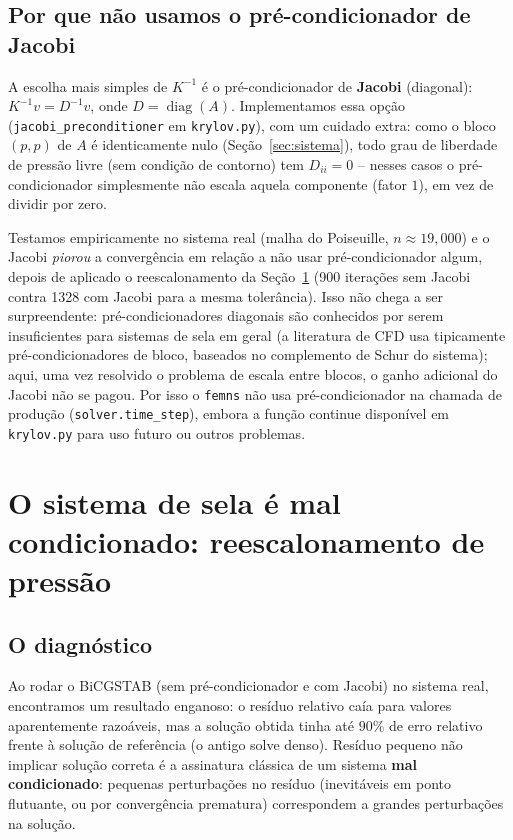 \documentclass[11pt,a4paper]{article}
\begin{document}
\subsection{Por que não usamos o pré-condicionador de Jacobi}

A escolha mais simples de $K^{-1}$ é o pré-condicionador de
\textbf{Jacobi} (diagonal): $K^{-1}v = D^{-1}v$, onde $D =
\operatorname{diag}(A)$. Implementamos essa opção
(\texttt{jacobi\_preconditioner} em \texttt{krylov.py}), com um cuidado
extra: como o bloco $(p,p)$ de $A$ é identicamente nulo
(Seção~\ref{sec:sistema}), todo grau de liberdade de pressão livre
(sem condição de contorno) tem $D_{ii}=0$ -- nesses casos o
pré-condicionador simplesmente não escala aquela componente (fator
$1$), em vez de dividir por zero.

Testamos empiricamente no sistema real (malha do Poiseuille,
$n\approx 19{,}000$) e o Jacobi \emph{piorou} a convergência em
relação a não usar pré-condicionador algum, depois de aplicado o
reescalonamento da Seção~\ref{sec:reescalonamento} (900 iterações sem
Jacobi contra 1328 com Jacobi para a mesma tolerância). Isso não chega
a ser surpreendente: pré-condicionadores diagonais são conhecidos por
serem insuficientes para sistemas de sela em geral (a literatura de
CFD usa tipicamente pré-condicionadores de bloco, baseados no
complemento de Schur do sistema); aqui, uma vez resolvido o problema
de escala entre blocos, o ganho adicional do Jacobi não se pagou.
Por isso o \texttt{femns} não usa pré-condicionador na chamada de
produção (\texttt{solver.time\_step}), embora a função continue
disponível em \texttt{krylov.py} para uso futuro ou outros problemas.

\section{O sistema de sela é mal condicionado: reescalonamento de pressão}
\label{sec:reescalonamento}

\subsection{O diagnóstico}

Ao rodar o BiCGSTAB (sem pré-condicionador e com Jacobi) no sistema
real, encontramos um resultado enganoso: o resíduo relativo caía para
valores aparentemente razoáveis, mas a solução obtida tinha até
$90\%$ de erro relativo frente à solução de referência (o antigo solve
denso). Resíduo pequeno não implicar solução correta é a assinatura
clássica de um sistema \textbf{mal condicionado}: pequenas perturbações
no resíduo (inevitáveis em ponto flutuante, ou por convergência
prematura) correspondem a grandes perturbações na solução.
\end{document}
